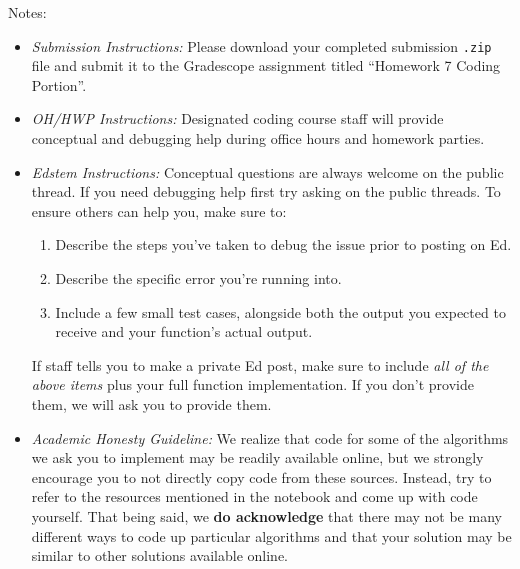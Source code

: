 \documentclass[11pt]{article}
\begin{document}
\noindent Notes:
\begin{itemize}
    \item \textit{Submission Instructions:} Please download your completed submission \texttt{.zip} file and submit it to the Gradescope assignment titled ``Homework 7 Coding Portion''.
        
    \item \textit{OH/HWP Instructions:} Designated coding course staff will provide conceptual and debugging help during office hours and homework parties.

    \item \textit{Edstem Instructions:} Conceptual questions are always welcome on the public thread. If you need debugging help first try asking on the public threads. To ensure others can help you, make sure to:
        \begin{enumerate}
            \item Describe the steps you've taken to debug the issue prior to posting on Ed.
            \item Describe the specific error you're running into.
            \item Include a few small test cases, alongside both the output you expected to receive and your function's actual output. 
        \end{enumerate}
    If staff tells you to make a private Ed post, make sure to include \textit{all of the above items} plus your full function implementation. If you don't provide them, we will ask you to provide them.
    
    \item \textit{Academic Honesty Guideline:} We realize that code for some of the algorithms we ask you to implement may be readily available online, but we strongly encourage you to not directly copy code from these sources. Instead, try to refer to the resources mentioned in the notebook and come up with code yourself. That being said, we \textbf{do acknowledge} that there may not be many different ways to code up particular algorithms and that your solution may be similar to other solutions available online.
    
\end{itemize}
\end{document}
